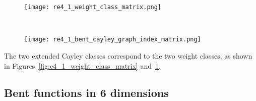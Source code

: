 \documentclass[12pt,a4paper]{article}
\begin{document}
\begin{figure}[!bhpt] %
\centering
\begin{minipage}{.48\textwidth}
  \centering
  \texttt{[image: re4\_1\_weight\_class\_matrix.png]}
  \label{fig:c4_1_weight_class_matrix}
\end{minipage}%
~~~~
\begin{minipage}{.48\textwidth}
  \centering
  \texttt{[image: re4\_1\_bent\_cayley\_graph\_index\_matrix.png]}
  \label{fig:c4_1_bent_cayley_graph_index_matrix}
\end{minipage}
\end{figure}
The two extended Cayley classes correspond to the two weight classes,
as shown in Figures~\ref{fig:c4_1_weight_class_matrix} and~\ref{fig:c4_1_bent_cayley_graph_index_matrix}.

\subsection{Bent functions in 6 dimensions}
\end{document}
